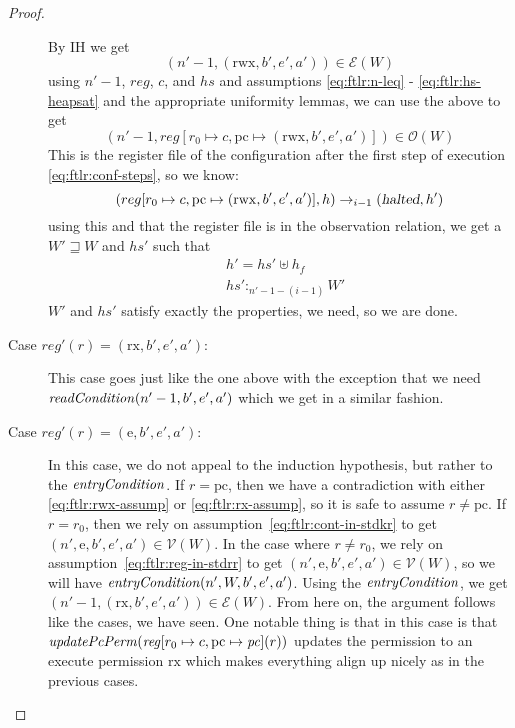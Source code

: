 \documentclass{article}
\newcommand{\var}[1]{\mathit{#1}}
\newcommand{\hs}{\var{hs}}
\newcommand{\pc}{\mathit{pc}}
\newcommand{\pcreg}{\mathrm{pc}}
\newcommand{\reg}{\var{reg}}
\newcommand{\heap}{\var{heap}}
\newcommand{\halted}{\textsl{halted}}
\newcommand{\plainfun}[2]{
  \ifthenelse{\equal{#2}{}}
             {\mathit{#1}}
             {\mathit{#1}(#2)}
}
\newcommand{\updatePcPerm}[1]{\plainfun{updatePcPerm}{#1}}
\newcommand{\readCond}[1]{\plainfun{readCondition}{#1}}
\newcommand{\entryCond}[1]{\plainfun{entryCondition}{#1}}
\newcommand{\future}{\mathbin{\sqsupseteq}}
\newcommand{\heapSat}[3][\heap]{#1 :_{#2} #3}
\newcommand{\asmType}{\plaindom{AsmType}}
\newcommand{\plaindom}[1]{\mathrm{#1}}
\newcommand{\intr}[2]{\mathcal{#1}}
\newcommand{\valueintr}[1]{\intr{V}{#1}}
\newcommand{\exprintr}[1]{\intr{E}{#1}}
\newcommand{\stdvr}{\valueintr{\asmType}}
\newcommand{\stder}{\exprintr{\asmType}}
\newcommand{\observations}{\mathcal{O}}
\newcommand{\npair}[2][n]{\left(#1,#2 \right)}
\newcommand{\plainperm}[1]{\mathrm{#1}}
\newcommand{\exec}{\plainperm{rx}}
\newcommand{\entry}{\plainperm{e}}
\newcommand{\rwx}{\plainperm{rwx}}
\newcommand{\step}[1][]{\rightarrow_{#1}}
\begin{document}
\begin{proof}
\begin{description}
By IH we get 
\begin{equation}
  \npair[n'-1]{(\rwx,b',e',a')} \in \stder(W) \nonumber
\end{equation}
using $n'-1$, $\reg$, $c$, and $\hs$ and assumptions \ref{eq:ftlr:n-leq} - \ref{eq:ftlr:hs-heapsat} and the appropriate uniformity lemmas, we can use the above to get
\begin{equation}
  \npair[n'-1]{reg[r_0 \mapsto c, \pcreg \mapsto (\rwx,b',e',a')]} \in \observations(W) \nonumber
\end{equation}
This is the register file of the configuration after the first step of execution \ref{eq:ftlr:conf-steps}, so we know:
\begin{equation}
  (reg[r_0 \mapsto c, \pcreg \mapsto (\rwx,b',e',a')],h) \step[i-1] (\halted, h') \nonumber
\end{equation}
using this and that the register file is in the observation relation, we get a $W' \future W$ and $\hs'$ such that 
\begin{align*}
  &h' = \hs' \uplus h_f \\
  &\heapSat[\hs']{n'-1-(i-1)}{W'}
\end{align*}
$W'$ and $\hs'$ satisfy exactly the properties, we need, so we are done.

\item[Case $\reg'(r) = (\exec,b',e',a')$:] This case goes just like the one above with the exception that we need $\readCond{n'-1,b',e',a'}$ which we get in a similar fashion.

\item[Case $\reg'(r) = (\entry,b',e',a')$:] In this case, we do not appeal to the induction hypothesis, but rather to the $\entryCond{}$. If $r=\pcreg$, then we have a contradiction with either \ref{eq:ftlr:rwx-assump} or \ref{eq:ftlr:rx-assump}, so it is safe to assume $r \neq \pcreg$. If $r=r_0$, then we rely on assumption~\ref{eq:ftlr:cont-in-stdkr} to get $\npair[n']{\entry,b',e',a'} \in \stdvr(W)$. In the case where $r \neq r_0$, we rely on assumption~\ref{eq:ftlr:reg-in-stdrr} to get $\npair[n']{\entry,b',e',a'} \in \stdvr(W)$, so we will have $\entryCond{n',W,b',e',a'}$. Using the $\entryCond{}$, we get $\npair[n'-1]{(\exec,b',e',a')}\in \stder(W)$. From here on, the argument follows like the cases, we have seen. One notable thing is that in this case is that $\updatePcPerm{\reg[r_0 \mapsto c, \pcreg \mapsto \pc](r)}$ updates the permission to an execute permission $\exec$ which makes everything align up nicely as in the previous cases.


\end{description}
\end{proof}
\end{document}

